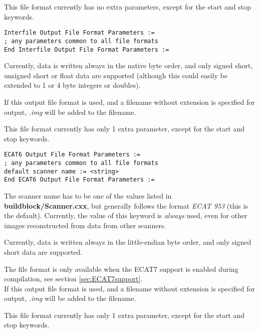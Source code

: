 \documentclass{article}
\begin{document}
{ 
}

This file format currently has no extra parameters, except for 
the start and stop keywords.

\begin{verbatim}
Interfile Output File Format Parameters :=
; any parameters common to all file formats
End Interfile Output File Format Parameters :=
\end{verbatim}

Currently, data is written always in the native byte order, and 
only signed short, unsigned short or float data are supported 
(although this could easily be extended to 1 or 4 byte integers 
or doubles).

{ 
}

If this output file format is used, and a filename without extension 
is specified for output, \textit{.img} will be added to the filename.

{ 
}

This file format currently has only 1 extra parameter, except 
for the start and stop keywords.

\begin{verbatim}
ECAT6 Output File Format Parameters :=
; any parameters common to all file formats
default scanner name := <string>
End ECAT6 Output File Format Parameters :=
\end{verbatim}

The scanner name has to be one of the values listed in \textbf{buildblock/Scanner.cxx}, 
but generally follows the format \textit{ECAT 953} (this is the default). 
Currently, the value of this keyword is \textit{always} used, even 
for other images reconstructed from data from other scanners.

Currently, data is written always in the little-endian byte order, 
and only signed short data are supported.

{ 
}

The file format is only available when the ECAT7 support is enabled 
during compilation, see section \ref{sec:ECAT7support}.\\
If this output file format is used, and a filename without extension 
is specified for output, \textit{.img} will be added to the filename.

{ 
}

This file format currently has only 1 extra parameter, except 
for the start and stop keywords.
\end{document}
